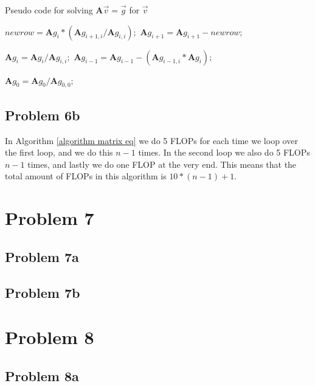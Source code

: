 \documentclass[english,notitlepage]{revtex4-1}  %
\begin{document}
\begin{algorithm}[H]
    \caption{Pseudo code for solving $\textbf{A}\vec{v} = \vec{g}$ for $\vec{v}$}\label{algorithm matrix eq}
    \begin{algorithmic}
         
        \State $newrow = \textbf{A}g_i * \left(\textbf{A}g_{i+1,i} / \textbf{A}g_{i,i} \right);$ 
        \State $\textbf{A}g_{i+1} = \textbf{A}g_{i+1} - newrow;$
        \EndFor

         
        \State $\textbf{A}g_{i} = \textbf{A}g_{i} / \textbf{A}g_{i,i};$
        \State $\textbf{A}g_{i-1} = \textbf{A}g_{i-1} - \left(\textbf{A}g_{i-1,i}*\textbf{A}g_{i}\right);$
        \EndFor

        \State $\textbf{A}g_{0} = \textbf{A}g_{0} / \textbf{A}g_{0,0};$ 
    \end{algorithmic}
\end{algorithm}

\subsection*{Problem 6b}
In Algorithm \ref*{algorithm matrix eq} we do 5 FLOPs for each time we loop over the first loop, and we do this $n-1$ times. In the second loop we also do 5 FLOPs $n-1$ times, and lastly we do one FLOP at the very end. This means that the total amount of FLOPs in this algorithm is $10*(n-1) + 1$.


\section*{Problem 7}
\subsection*{Problem 7a}

\subsection*{Problem 7b}


\section*{Problem 8}
\subsection*{Problem 8a}
\end{document}
